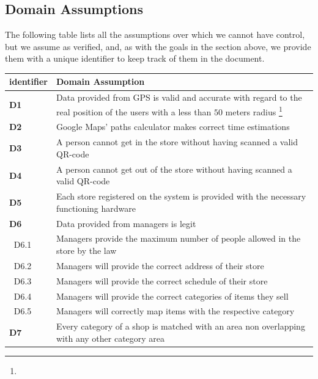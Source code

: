 \FloatBarrier

\subsection{Domain Assumptions}
\label{subsect:domainassumptions}

The following table lists all the assumptions over which we cannot have control, but we assume as verified, and, as with the goals in the section above, we provide them with a unique identifier to keep track of them in the document.

\begin{table}[h!]
    \centering
    \begin{tabular}{@{}P{0.1\textwidth}P{0.80\textwidth}@{}}
        \toprule
        \textbf{identifier}& \textbf{Domain Assumption}\\
        \midrule
        \textbf{D1}        & Data provided from GPS is valid and accurate with regard to the real position of the users with a less than $50$ meters radius \footnote{}\\
        \textbf{D2}        & Google Maps' paths calculator makes correct time estimations\\
        \textbf{D3}        & A person cannot get in the store without having scanned a valid QR-code\\
        \textbf{D4}        & A person cannot get out of the store without having scanned a valid QR-code\\
        \textbf{D5}        & Each store registered on the system is provided with the necessary functioning hardware\\
        \textbf{D6}        & Data provided from managers is legit\\
        $\;\;$D6.1         & Managers provide the maximum number of people allowed in the store by the law\\
        $\;\;$D6.2         & Managers will provide the correct address of their store\\
        $\;\;$D6.3         & Managers will provide the correct schedule of their store\\
        $\;\;$D6.4         & Managers will provide the correct categories of items they sell\\
        $\;\;$D6.5         & Managers will correctly map items with the respective category\\
        \textbf{D7}        & Every category of a shop is matched with an area non overlapping with any other category area\\

\end{tabular}
\end{table}
